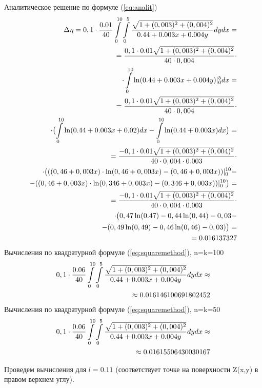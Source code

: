 \documentclass{article}
\begin{document}
Аналитическое решение по формуле (\ref{eq:analit})
\begin{align} \label{eq:analit1:med}
\Delta \eta = 0,1 \cdot \frac{0.01}{40} \int\limits_0^{10} \int\limits_0^5 \frac{\sqrt{1+(0,003)^2+(0,004)^2}}{0.44 + 0.003x + 0.004y} dy dx = \notag \\
= \frac{0,1 \cdot 0.01\sqrt{1+(0,003)^2+(0,004)^2}}{40 \cdot 0,004} \cdot \notag \\
\cdot \int\limits_0^{10} \ln(0.44 + 0.003x + 0.004y)|_0^5 dx = \notag \\
= \frac{0,1 \cdot 0.01\sqrt{1+(0,003)^2+(0,004)^2}}{40 \cdot 0,004} \cdot \notag \\
\cdot \bigl(\int\limits_0^{10} \ln(0.44 + 0.003x + 0.02)dx - \int\limits_0^{10} \ln(0.44 + 0.003x)dx \bigr) = \notag \\
= \frac{-0,1 \cdot 0.01\sqrt{1+(0,003)^2+(0,004)^2}}{40 \cdot 0,004 \cdot 0.003} \cdot \notag \\
\cdot \bigl(((0,46+0,003x) \cdot \ln(0,46+0,003x) - (0,46+0,003x))|_0^{10} - \notag \\
- ((0,46+0,003x) \cdot \ln(0,346+0,003x) - (0,346+0,003x))|_0^{10}\bigr) = \notag \\
= \frac{-0,1 \cdot 0.01\sqrt{1+(0,003)^2+(0,004)^2}}{40 \cdot 0,004 \cdot 0.003} \cdot \notag \\
\cdot \bigl(0,47 \ln(0.47)-0,44 \ln(0,44)-0,03- \notag \\
- (0,49 \ln(0,49)-0,46 \ln(0,46)-0,03)\bigr) = \notag \\
= 0.016137327
\end{align}
Вычисления по квадратурной формуле (\ref{eq:squaremethod}), n=k=100
\begin{align}\label{eq:sq1med10}
0,1 \cdot \frac{0.06}{40} \int\limits_0^{10} \int\limits_0^5 \frac{\sqrt{1+(0,003)^2+(0,004)^2}}{0.44 + 0.003x + 0.004y} dy dx \approx \notag \\ \approx 0.016146100691802452
\end{align}
Вычисления по квадратурной формуле (\ref{eq:squaremethod}), n=k=50
\begin{align}\label{eq:sq1med5}
0,1 \cdot \frac{0.06}{40} \int\limits_0^{10} \int\limits_0^5 \frac{\sqrt{1+(0,003)^2+(0,004)^2}}{0.44 + 0.003x + 0.004y} dy dx \approx \notag \\ \approx 0.01615506430030167
\end{align}

Проведем вычисления для $l=0.11$ (соответствует точке на поверхности Z(x,y) в правом верхнем углу). %
\end{document}
